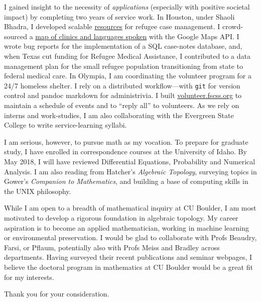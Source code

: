 I gained insight to the necessity of \emph{applications} (especially
with positive societal impact) by completing two years of service work.
In Houston, under Shaoli Bhadra, I developed scalable
\href{https://github.com/coltongrainger/ymca-resources}{resources} for
refugee case management. I crowd-sourced a
\href{https://drive.google.com/open?id=1kk9yn6-4nifHLIf2tGYbW_7PiYo\&usp=sharing}{map
of clinics and languages spoken} with the Google Maps API. I wrote bug
reports for the implementation of a SQL case-notes database, and, when
Texas cut funding for Refugee Medical Assistance, I contributed to a
data management plan for the small refugee population transitioning from
state to federal medical care. In Olympia, I am coordinating the
volunteer program for a 24/7 homeless shelter. I rely on a distributed
workflow---with \texttt{git} for version control and pandoc markdown for
administrivia. I built
\href{http://volunteer.fscss.org}{volunteer.fscss.org} to maintain a
schedule of events and to ``reply all'' to volunteers. As we rely on
interns and work-studies, I am also collaborating with the Evergreen
State College to write service-learning syllabi.

I am serious, however, to pursue math as my vocation. To prepare for
graduate study, I have enrolled in correspondence courses at the
University of Idaho. By May 2018, I will have reviewed Differential
Equations, Probability and Numerical Analysis. I am also reading from
Hatcher's \emph{Algebraic Topology}, surveying topics in Gower's
\emph{Companion to Mathematics}, and building a base of computing skills
in the UNIX philosophy.

While I am open to a breadth of mathematical inquiry at CU Boulder, I am
most motivated to develop a rigorous foundation in algebraic topology.
My career aspiration is to become an applied mathematician, working in
machine learning or environmental preservation. I would be glad to
collaborate with Profs Beaudry, Farsi, or Pflaum, potentially also with
Profs Meiss and Bradley across departments. Having surveyed their recent
publications and seminar webpages, I believe the doctoral program in
mathematics at CU Boulder would be a great fit for my interests.

Thank you for your consideration.
